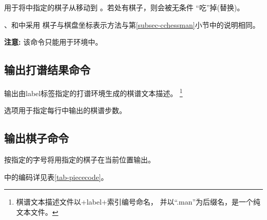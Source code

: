 \documentclass[full]{l3doc}
\begin{document}
\begin{documentation}
\begin{function}{\mov}
  \begin{syntax}
     
  \end{syntax}
\end{function}

  用于将中指定的棋子从移动到%
  。若处有棋子，则会被无条件
  ``吃''掉(替换)。

  、和中采用
  棋子与棋盘坐标表示方法与第\ref{subsec-cchessman}小节中的说明相同。

  \textbf{\textsf{注意: }}该命令只能用于环境中。

\subsection{输出打谱结果命令}

\begin{function}{\printman}
  \begin{syntax}
      
  \end{syntax}
\end{function}

  输出由label标签指定的打谱环境生成的棋谱文本描述。
  \footnote{棋谱文本描述文件以+label+索引编号命名，
            并以``.man''为后缀名，是一个纯文本文件。}

  选项用于指定每行中输出的棋谱步数。

\subsection{输出棋子命令}

\begin{function}{\getpiece}
  \begin{syntax}
      
  \end{syntax}
\end{function}

  按指定的字号将用指定的棋子在当前位置输出。

  中的编码详见表\ref{tab-piececode}。

\begin{SideBySideExample}[frame=single,numbers=left,
                xrightmargin=.28\linewidth,gobble=2]
  \centering


\end{SideBySideExample}
\end{documentation}
\end{document}
